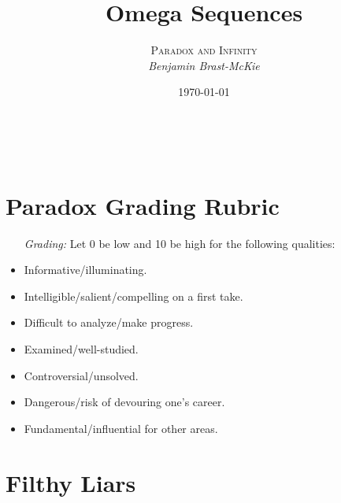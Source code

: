\documentclass[a4paper, 11pt]{article} %
\title{\textbf{Omega Sequences}} %
\author{\textsc{Paradox and Infinity}\\ \em Benjamin Brast-McKie} %
\date{\today} %
\makeatletter
\renewcommand{\maketitle}{ %
\begin{flushright} %
{\LARGE\@title} %

\vspace{10pt} %

{\@author} %
\\\@date %

\vspace{-20pt} %
\end{flushright}
}
\makeatother
\begin{document}
\maketitle %

\thispagestyle{empty}


\section*{Paradox Grading Rubric}

\begin{itemize}
  \item[\it Grading:] Let 0 be low and 10 be high for the following qualities:
    \item Informative/illuminating.
    \item Intelligible/salient/compelling on a first take.
    \item Difficult to analyze/make progress.
    \item Examined/well-studied.
    \item Controversial/unsolved.
    \item Dangerous/risk of devouring one's career.
    \item Fundamental/influential for other areas.
\end{itemize}



\section*{Filthy Liars}
\end{document}
